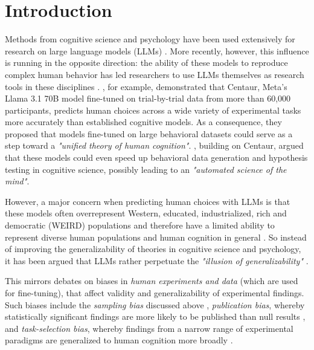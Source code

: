 \section{Introduction}
\label{sec:introduction}

 Methods from cognitive science and psychology have been used extensively for research on large language models (LLMs) \citep{binz2023using, hagendorff2024machinepsychology}. More recently, however, this influence is running in the opposite direction: the ability of these models to reproduce complex human behavior has led researchers to use LLMs themselves as research tools in these disciplines \citep{dillion2023can,demszky2023using}. \citet{binz2025centaur}, for example, demonstrated that Centaur, Meta's Llama 3.1 70B model fine-tuned on trial-by-trial data from more than 60,000 participants, predicts human choices across a wide variety of experimental tasks more accurately than established cognitive models. As a consequence, they proposed that models fine-tuned on large behavioral datasets could serve as a step toward a \textit{"unified theory of human cognition"}. \citet{jagadish2026toward}, building on Centaur, argued that these models could even speed up behavioral data generation and hypothesis testing in cognitive science, possibly leading to an \textit{"automated science of the mind"}.

However, a major concern when predicting human choices with LLMs is that these models often overrepresent Western, educated, industrialized, rich and democratic (WEIRD) populations and therefore have a limited ability to represent diverse human populations and human cognition in general \citep{atari2023humans}. So instead of improving the generalizability of theories in cognitive science and psychology, it has been argued that LLMs rather perpetuate the \textit{"illusion of generalizability"} \citep{crockett2025ai}.

This mirrors debates on biases in \textit{human experiments and data} (which are used for fine-tuning), that affect validity and generalizability of experimental findings. Such biases include the \textit{sampling bias} discussed above \citep{henrich2010weirdest}, \textit{publication bias}, whereby statistically significant findings are more likely to be published than null results \citep{franco2014publication}, and \textit{task-selection bias}, whereby findings from a narrow range of experimental paradigms are generalized to human cognition more broadly \citep{yarkoni2022generalizability}.

